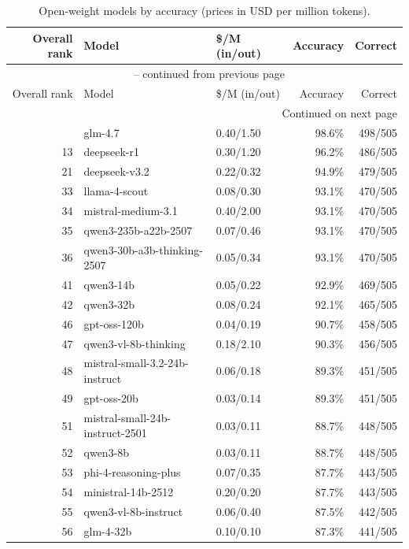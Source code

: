 \documentclass[11pt]{article}
\begin{document}
\begin{longtable}{rllrr}
  \caption{Open-weight models by accuracy (prices in USD per million tokens).} \label{tab:open_weight} \\
  \toprule
  Overall rank & Model & \$/M (in/out) & Accuracy & Correct \\
  \midrule
  \endfirsthead
  \multicolumn{5}{c}{\tablename\ \thetable{} -- continued from previous page} \\
  \toprule
  Overall rank & Model & \$/M (in/out) & Accuracy & Correct \\
  \midrule
  \endhead
  \midrule \multicolumn{5}{r}{Continued on next page} \\
  \endfoot
  \bottomrule
  \endlastfoot
  2 & glm-4.7 & 0.40/1.50 & 98.6\% & 498/505 \\
  13 & deepseek-r1 & 0.30/1.20 & 96.2\% & 486/505 \\
  21 & deepseek-v3.2 & 0.22/0.32 & 94.9\% & 479/505 \\
  33 & llama-4-scout & 0.08/0.30 & 93.1\% & 470/505 \\
  34 & mistral-medium-3.1 & 0.40/2.00 & 93.1\% & 470/505 \\
  35 & qwen3-235b-a22b-2507 & 0.07/0.46 & 93.1\% & 470/505 \\
  36 & qwen3-30b-a3b-thinking-2507 & 0.05/0.34 & 93.1\% & 470/505 \\
  41 & qwen3-14b & 0.05/0.22 & 92.9\% & 469/505 \\
  42 & qwen3-32b & 0.08/0.24 & 92.1\% & 465/505 \\
  46 & gpt-oss-120b & 0.04/0.19 & 90.7\% & 458/505 \\
  47 & qwen3-vl-8b-thinking & 0.18/2.10 & 90.3\% & 456/505 \\
  48 & mistral-small-3.2-24b-instruct & 0.06/0.18 & 89.3\% & 451/505 \\
  49 & gpt-oss-20b & 0.03/0.14 & 89.3\% & 451/505 \\
  51 & mistral-small-24b-instruct-2501 & 0.03/0.11 & 88.7\% & 448/505 \\
  52 & qwen3-8b & 0.03/0.11 & 88.7\% & 448/505 \\
  53 & phi-4-reasoning-plus & 0.07/0.35 & 87.7\% & 443/505 \\
  54 & ministral-14b-2512 & 0.20/0.20 & 87.7\% & 443/505 \\
  55 & qwen3-vl-8b-instruct & 0.06/0.40 & 87.5\% & 442/505 \\
  56 & glm-4-32b & 0.10/0.10 & 87.3\% & 441/505 \\

\end{longtable}
\end{document}
